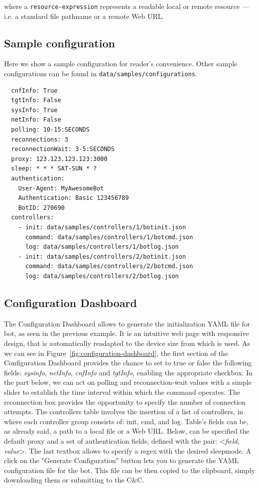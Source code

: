 where a \texttt{resource-expression} represents a readable local or remote resource — i.e. a standard file pathname or a remote Web URL.

\subsection{Sample configuration}
\label{sec:sample-configuration}

Here we show a sample configuration for reader's convenience. Other sample configurations can be found in \texttt{data/samples/configurations}.

\begin{verbatim}
  cnfInfo: True
  tgtInfo: False
  sysInfo: True
  netInfo: False
  polling: 10-15:SECONDS
  reconnections: 3
  reconnectionWait: 3-5:SECONDS
  proxy: 123.123.123.123:3000
  sleep: * * * SAT-SUN * ?
  authentication:
    User-Agent: MyAwesomeBot
    Authentication: Basic 123456789
    BotID: 270690
  controllers:
    - init: data/samples/controllers/1/botinit.json
      command: data/samples/controllers/1/botcmd.json
      log: data/samples/controllers/1/botlog.json
    - init: data/samples/controllers/2/botinit.json
      command: data/samples/controllers/2/botcmd.json
      log: data/samples/controllers/2/botlog.json
\end{verbatim}

\subsection{Configuration Dashboard}\label{sec:configuration-dashboard}
The Configuration Dashboard allows to generate the initialization YAML file for bot, as seen in the previous example. It is an intuitive web page with responsive design, that is automatically readapted to the device size from which is used. As we can see in Figure~\ref{fig:configuration-dashboard}, the first section of the Configuration Dashboard provides the chance to set to true or false the following fields: \textit{sysinfo}, \textit{netInfo}, \textit{cnfInfo} and \textit{tgtInfo}, enabling the appropriate checkbox. In the part below, we can act on polling and reconnection-wait values with a simple slider to establish the time interval within which the command operates. The reconnection box provides the opportunity to specify the number of connection attempts. The controllers table involves the insertion of a list of controllers, in where each controller group consists of: init, cmd, and log. Table’s fields can be, as already said, a path to a local file or a Web URL. Below, can be specified the default proxy and a set of authentication fields, defined with the pair: <\textit{field}, \textit{value}>. The last textbox allows to specify a regex with the desired sleepmode. A click on the "Generate Configuration" button lets you to generate the YAML configuration file for the bot. This file can be then copied to the clipboard, simply downloading them or submitting to the C\&C.

